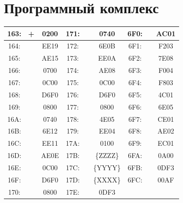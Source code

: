 \documentclass[12pt,a4paper]{report}
\begin{document}
    \section*{Программный комплекс}
    \begin{center}
        \begin{tabular}{|ccc|ccc||ccc|}
            \hline
            163: & + & 0200 & 171: & & 0740 & 6F0: & & AC01 \\
            \hline
            164: &   & EE19 & 172: & & 6E0B & 6F1: & & F203 \\
            \hline
            165: &   & AE15 & 173: & & EE0A & 6F2: & & 7E08 \\
            \hline
            166: &   & 0700 & 174: & & AE08 & 6F3: & & F004 \\
            \hline
            167: &   & 0C00 & 175: & & 0C00 & 6F4: & & F803 \\
            \hline
            168: &   & D6F0 & 176: & & D6F0 & 6F5: & & 4C01 \\
            \hline
            169: &   & 0800 & 177: & & 0800 & 6F6: & & 6E05 \\
            \hline
            16A: &   & 0740 & 178: & & 4E05 & 6F7: & & CE01 \\
            \hline
            16B: &   & 6E12 & 179: & & EE04 & 6F8: & & AE02 \\
            \hline
            16C: &   & EE11 & 17A: & & 0100 & 6F9: & & EC01 \\
            \hline
            16D: &   & AE0E & 17B: & & \{ZZZZ\} & 6FA: & & 0A00 \\
            \hline
            16E: &   & 0C00 & 17C: & & \{YYYY\} & 6FB: & & 0DF3 \\
            \hline
            16F: &   & D6F0 & 17D: & & \{XXXX\} & 6FC: & & 00AF \\
            \hline
            170: &   & 0800 & 17E: & & 0DF3 & & & \\
            \hline
        \end{tabular}
    \end{center}
\end{document}
